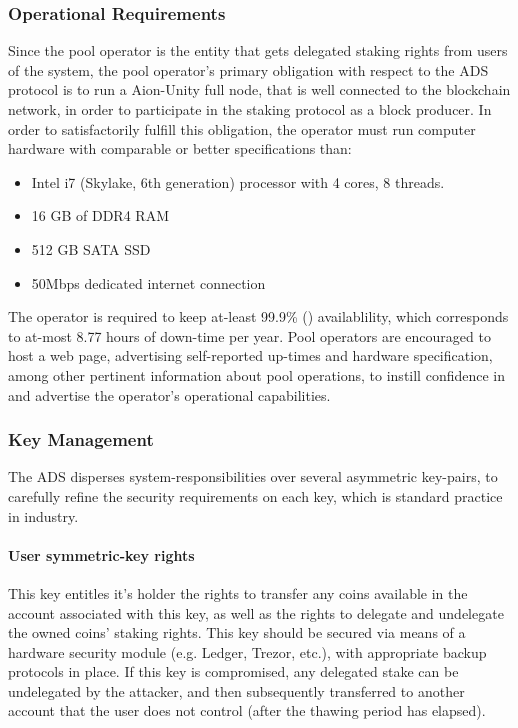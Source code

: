 \subsubsection{Operational Requirements} \label{operator_requirements}
Since the pool operator is the entity that gets delegated staking rights from users of the system, the pool operator's primary obligation with respect to the ADS protocol is to run a Aion-Unity full node, that is well connected to the blockchain network, in order to participate in the staking protocol as a block producer. In order to satisfactorily fulfill this obligation, the operator must run computer hardware with comparable or better specifications than:
\begin{itemize}
    \item Intel i7 (Skylake, 6th generation) processor with 4 cores, 8 threads.
    \item 16 GB of DDR4 RAM 
    \item 512 GB SATA SSD
    \item 50Mbps dedicated internet connection  
\end{itemize}
The operator is required to keep at-least 99.9\% () availablility, which corresponds to at-most 8.77 hours of down-time per year. Pool operators are encouraged to host a web page, advertising self-reported up-times and hardware specification, among other pertinent information about pool operations, to instill confidence in and advertise the operator's operational capabilities. 

\subsubsection{Key Management} \label{key_management}
The ADS disperses system-responsibilities over several asymmetric key-pairs, to carefully refine the security requirements on each key, which is standard practice in industry.

\paragraph{User symmetric-key rights} This key entitles it's holder the rights to transfer any coins available in the account associated with this key, as well as the rights to delegate and undelegate the owned coins' staking rights. This key should be secured via means of a hardware security module (e.g. Ledger, Trezor, etc.), with appropriate backup protocols in place. If this key is compromised, any delegated stake can be undelegated by the attacker, and then subsequently transferred to another account that the user does not control (after the thawing period has elapsed). 

